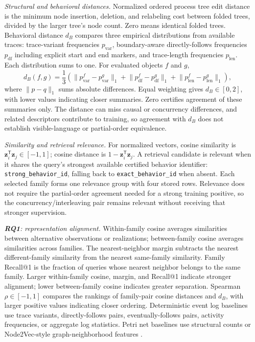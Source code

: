 \documentclass[mathematics,article,submit,moreauthors]{Definitions/mdpi}
\newcommand{\RQone}{\textbf{RQ1}}
\newcommand{\vect}[1]{\boldsymbol{#1}}
\begin{document}
\emph{Structural and behavioral distances.} Normalized ordered process tree edit distance is the minimum node insertion, deletion, and relabeling cost between folded trees, divided by the larger tree's node count. Zero means identical folded trees. Behavioral distance $d_B$ compares three empirical distributions from available traces: trace-variant frequencies $p_{\mathrm{var}}$, boundary-aware directly-follows frequencies $p_{\mathrm{df}}$ including explicit start and end markers, and trace-length frequencies $p_{\mathrm{len}}$. Each distribution sums to one. For evaluated objects $f$ and $g$,
\begin{equation}
d_B(f,g)=\frac{1}{3}\left(
 \lVert p_{\mathrm{var}}^f-p_{\mathrm{var}}^g\rVert_1+
 \lVert p_{\mathrm{df}}^f-p_{\mathrm{df}}^g\rVert_1+
 \lVert p_{\mathrm{len}}^f-p_{\mathrm{len}}^g\rVert_1
\right),
\label{eq:behavior-distance}
\end{equation}
where $\lVert p-q\rVert_1$ sums absolute differences. Equal weighting gives $d_B\in[0,2]$, with lower values indicating closer summaries. Zero certifies agreement of these summaries only. The distance can miss causal or concurrency differences, and related descriptors contribute to training, so agreement with $d_B$ does not establish visible-language or partial-order equivalence.

\emph{Similarity and retrieval relevance.} For normalized vectors, cosine similarity is $\vect z_i^{\mathsf T}\vect z_j\in[-1,1]$; cosine distance is $1-\vect z_i^{\mathsf T}\vect z_j$. A retrieval candidate is relevant when it shares the query's strongest available certified behavior identifier: \texttt{strong\_behavior\_id}, falling back to \texttt{exact\_behavior\_id} when absent. Each selected family forms one relevance group with four stored rows. Relevance does not require the partial-order agreement needed for a strong training positive, so the concurrency/interleaving pair remains relevant without receiving that stronger supervision.

\emph{\RQone: representation alignment.} Within-family cosine averages similarities between alternative observations or realizations; between-family cosine averages similarities across families. The nearest-neighbor margin subtracts the nearest different-family similarity from the nearest same-family similarity. Family Recall@1 is the fraction of queries whose nearest neighbor belongs to the same family. Larger within-family cosine, margin, and Recall@1 indicate stronger alignment; lower between-family cosine indicates greater separation. Spearman $\rho\in[-1,1]$ compares the rankings of family-pair cosine distances and $d_B$, with larger positive values indicating closer ordering. Deterministic event log baselines use trace variants, directly-follows pairs, eventually-follows pairs, activity frequencies, or aggregate log statistics. Petri net baselines use structural counts or Node2Vec-style graph-neighborhood features \cite{Grover2016}.
\end{document}
